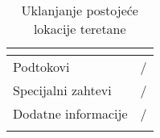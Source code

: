 \documentclass[../main.tex]{subfiles}
\begin{document}
\begin{longtable}{| p{} | p{} |}
\begin{itemize}
    \end{itemize}\\
\hline
    Podtokovi & /\\
\hline
    Specijalni zahtevi & /\\
\hline
    Dodatne informacije & /\\
\hline
\caption{Uklanjanje postojeće lokacije teretane} %
\end{longtable}
\end{document}
